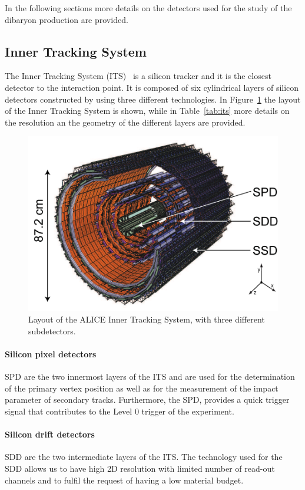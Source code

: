 In the following sections more details on the detectors used for the study of the \dst dibaryon
production are provided.

%
\subsection{Inner Tracking System} \label{sec:its}

The Inner Tracking System (ITS)~\cite{alicemulti,alice:Perf2014} is a silicon tracker and it is
the closest detector to the interaction point.
It is composed of six cylindrical layers of silicon detectors constructed by using three different
technologies.
In Figure~\ref{fig:its} the layout of the Inner Tracking System is shown, while in
Table~\ref{tab:its} more details on the resolution an the geometry of the different layers are
provided.

\begin{figure}
    \centering
    \includegraphics[width=0.7 \textwidth]{gfx/its}
	\caption{Layout of the ALICE Inner Tracking System, with three different subdetectors.}
	\label{fig:its}
\end{figure}

\paragraph{Silicon pixel detectors} 
SPD are the two innermost layers of the ITS and are
used for the determination of the primary vertex position as well as for the measurement of
the impact parameter of secondary tracks.
Furthermore, the SPD, provides a quick trigger signal that contributes to the Level 0 trigger of 
the experiment.

\paragraph{Silicon drift detectors} 
SDD are the two intermediate layers of the ITS. The technology used for the SDD 
allows us to have high 2D resolution with limited number of read-out channels and to fulfil the
request of having a low material budget.


